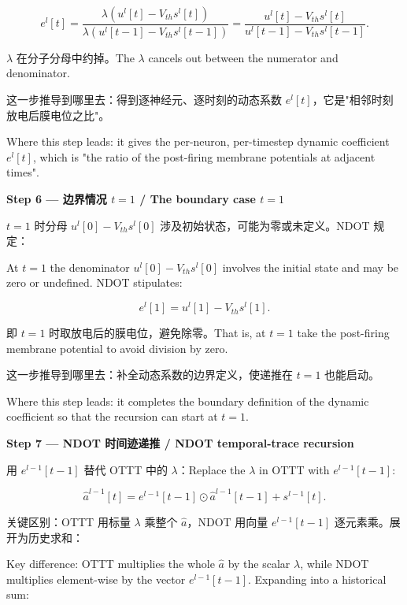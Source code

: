 \documentclass[journal,12pt,onecolumn]{IEEEtran}
\begin{document}
\begin{equation}
e^l[t] = \frac{\lambda(u^l[t] - V_{th} s^l[t])}{\lambda(u^l[t-1] - V_{th} s^l[t-1])} = \frac{u^l[t] - V_{th} s^l[t]}{u^l[t-1] - V_{th} s^l[t-1]}.
\end{equation}

$\lambda$ 在分子分母中约掉。The $\lambda$ cancels out between the numerator and denominator.

这一步推导到哪里去：得到逐神经元、逐时刻的动态系数 $e^l[t]$，它是"相邻时刻放电后膜电位之比"。

Where this step leads: it gives the per-neuron, per-timestep dynamic coefficient $e^l[t]$, which is "the ratio of the post-firing membrane potentials at adjacent times".

\medskip\noindent\textbf{Step 6 — 边界情况 $t=1$ / The boundary case $t=1$}

$t=1$ 时分母 $u^l[0]-V_{th}s^l[0]$ 涉及初始状态，可能为零或未定义。NDOT 规定：

At $t=1$ the denominator $u^l[0]-V_{th}s^l[0]$ involves the initial state and may be zero or undefined. NDOT stipulates:

\begin{equation}
e^l[1] = u^l[1] - V_{th} s^l[1].
\end{equation}

即 $t=1$ 时取放电后的膜电位，避免除零。That is, at $t=1$ take the post-firing membrane potential to avoid division by zero.

这一步推导到哪里去：补全动态系数的边界定义，使递推在 $t=1$ 也能启动。

Where this step leads: it completes the boundary definition of the dynamic coefficient so that the recursion can start at $t=1$.

\medskip\noindent\textbf{Step 7 — NDOT 时间迹递推 / NDOT temporal-trace recursion}

用 $e^{l-1}[t-1]$ 替代 OTTT 中的 $\lambda$：Replace the $\lambda$ in OTTT with $e^{l-1}[t-1]$:

\begin{equation}
\hat{a}^{l-1}[t] = e^{l-1}[t-1] \odot \hat{a}^{l-1}[t-1] + s^{l-1}[t].
\end{equation}

关键区别：OTTT 用标量 $\lambda$ 乘整个 $\hat{a}$，NDOT 用向量 $e^{l-1}[t-1]$ 逐元素乘。展开为历史求和：

Key difference: OTTT multiplies the whole $\hat{a}$ by the scalar $\lambda$, while NDOT multiplies element-wise by the vector $e^{l-1}[t-1]$. Expanding into a historical sum:
\end{document}
